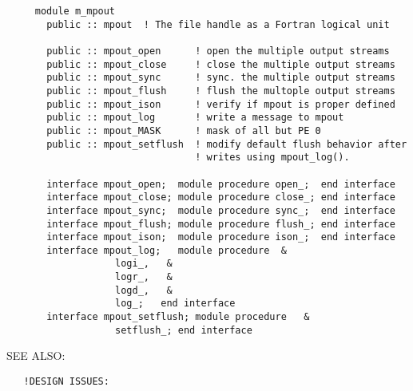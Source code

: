 \begin{verbatim} 
     module m_mpout
       public :: mpout	! The file handle as a Fortran logical unit
 
       public :: mpout_open      ! open the multiple output streams
       public :: mpout_close     ! close the multiple output streams
       public :: mpout_sync      ! sync. the multiple output streams
       public :: mpout_flush     ! flush the multople output streams
       public :: mpout_ison      ! verify if mpout is proper defined
       public :: mpout_log       ! write a message to mpout
       public :: mpout_MASK      ! mask of all but PE 0
       public :: mpout_setflush  ! modify default flush behavior after
                                 ! writes using mpout_log().
 
       interface mpout_open;  module procedure open_;  end interface
       interface mpout_close; module procedure close_; end interface
       interface mpout_sync;  module procedure sync_;  end interface
       interface mpout_flush; module procedure flush_; end interface
       interface mpout_ison;  module procedure ison_;  end interface
       interface mpout_log;   module procedure	&
                   logi_,	&
                   logr_,	&
                   logd_,	&
                   log_;   end interface
       interface mpout_setflush; module procedure	&
                   setflush_; end interface
 \end{verbatim}%
{\sf SEE ALSO:}
\begin{verbatim}  	
   !DESIGN ISSUES:
\end{verbatim}
